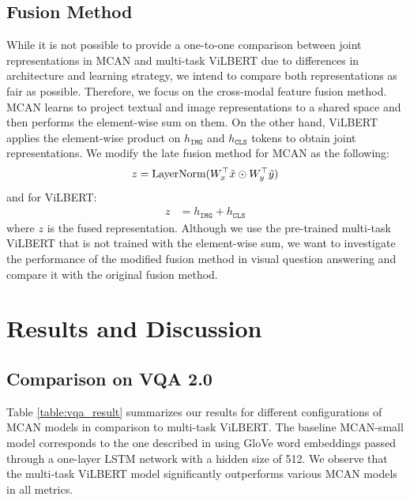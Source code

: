 \documentclass{article}
\begin{document}


\subsection{Fusion Method}
While it is not possible to provide a one-to-one comparison between joint representations in MCAN and multi-task ViLBERT due to differences in architecture and learning strategy, we intend to compare both representations as fair as possible. Therefore, we focus on the cross-modal feature fusion method. MCAN learns to project textual and image representations to a shared space and then performs the element-wise sum on them. On the other hand, ViLBERT applies the element-wise product on $h_{\mathtt{IMG}}$ and $h_\mathtt{CLS}$ tokens to obtain joint representations. We modify the late fusion method for MCAN as the following:
\begin{align}
    z &= \text{LayerNorm}(W^{\top}_{x}\Tilde{x} \odot W^{\top}_{y}\Tilde{y}) \\
\end{align}
and for ViLBERT:
\begin{align}
    z &= h_{\mathtt{IMG}} + h_{\mathtt{CLS}}
\end{align}
where $z$ is the fused representation. Although we use the pre-trained multi-task ViLBERT that is not trained with the element-wise sum, we want to investigate the performance of the modified fusion method in visual question answering and compare it with the original fusion method. 

\section{Results and Discussion}
\subsection{Comparison on VQA 2.0} \label{comp_vqa}
Table \ref{table:vqa_result} summarizes our results for different configurations of MCAN models in comparison to multi-task ViLBERT. The baseline MCAN-small model corresponds to the one described in \citet{yu2019mcan} using GloVe word embeddings passed through a one-layer LSTM network with a hidden size of 512. We observe that the multi-task ViLBERT model significantly outperforms various MCAN models in all metrics.
\end{document}
